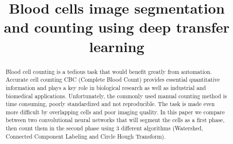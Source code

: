 \documentclass[conference]{IEEEtran}
\begin{document}
\title{Blood cells image segmentation and counting using deep transfer learning }

\author{
\and
{}
\and
{}
\and
{}
\and
{}
}

\maketitle

\begin{abstract}
Blood cell counting is a tedious task that would benefit greatly from automation. Accurate cell counting CBC (Complete Blood Count) provides essential quantitative information and plays a key role in biological research as well as industrial and biomedical applications. Unfortunately, the commonly used manual counting method is time consuming, poorly standardized and not reproducible. The task is made even more difficult by overlapping cells and poor imaging quality. In this paper we compare between two convolutional neural networks that will segment the cells as a first phase, then count them in the second phase using 3 different algorithms (Watershed, Connected Component Labeling and Circle Hough Transform).
\end{abstract}
\end{document}
